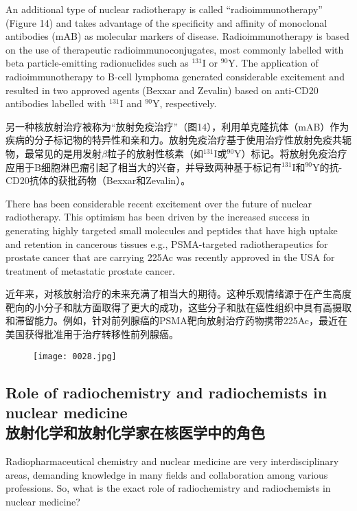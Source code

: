 \documentclass[dvipsnames, svgnames,a4paper,11pt]{article}
\begin{document}
An additional type of nuclear radiotherapy is called “radioimmunotherapy” (Figure 14) and takes advantage of the specificity and affinity of monoclonal antibodies (mAB) as molecular markers of disease. Radioimmunotherapy is based on the use of therapeutic radioimmunoconjugates, most commonly labelled with beta particle-emitting radionuclides such as ${}^\text{131}\text{I}$ or ${}^\text{90}\text{Y}$. The application of radioimmunotherapy to B-cell lymphoma generated considerable excitement and resulted in two approved agents (Bexxar and Zevalin) based on anti-CD20 antibodies labelled with ${}^\text{131}\text{I}$ and ${}^\text{90}\text{Y}$, respectively.

另一种核放射治疗被称为“放射免疫治疗”（图14），利用单克隆抗体（mAB）作为疾病的分子标记物的特异性和亲和力。放射免疫治疗基于使用治疗性放射免疫共轭物，最常见的是用发射$\beta$粒子的放射性核素（如${}^\text{131}\text{I}$或${}^\text{90}\text{Y}$）标记。将放射免疫治疗应用于B细胞淋巴瘤引起了相当大的兴奋，并导致两种基于标记有${}^\text{131}\text{I}$和${}^\text{90}\text{Y}$的抗-CD20抗体的获批药物（Bexxar和Zevalin）。

There has been considerable recent excitement over the future of nuclear radiotherapy. This optimism has been driven by the increased success in generating highly targeted small molecules and peptides that have high uptake and retention in cancerous tissues e.g., PSMA-targeted radiotherapeutics for prostate cancer that are carrying 225Ac was recently approved in the USA for treatment of metastatic prostate cancer.

近年来，对核放射治疗的未来充满了相当大的期待。这种乐观情绪源于在产生高度靶向的小分子和肽方面取得了更大的成功，这些分子和肽在癌性组织中具有高摄取和滞留能力。例如，针对前列腺癌的PSMA靶向放射治疗药物携带225Ac，最近在美国获得批准用于治疗转移性前列腺癌。

\begin{figure}[htbp]
      \centering
      \texttt{[image: 0028.jpg]}
       \label{fig14}
\end{figure}

\subsection{Role of radiochemistry and radiochemists in nuclear medicine\\放射化学和放射化学家在核医学中的角色}

Radiopharmaceutical chemistry and nuclear medicine are very interdisciplinary areas, demanding knowledge in many fields and collaboration among various professions. So, what is the exact role of radiochemistry and radiochemists in nuclear medicine?
\end{document}
